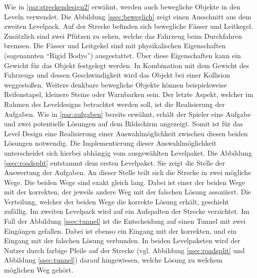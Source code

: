		Wie in \ref{par:streckendesign2} erwähnt, werden auch bewegliche Objekte in den Leveln verwendet. Die Abbildung \ref{ssec:beweglich} zeigt einen Ausschnitt aus dem zweiten Levelpack. Auf der Strecke befinden sich bewegliche Fässer und Leitkegel. Zusätzlich sind zwei Pfützen zu sehen, welche das Fahrzeug beim Durchfahren bremsen. Die Fässer und Leitgekel sind mit physikalischen Eigenschaften (sogenannten \enquote{Rigid Bodys}) ausgestattet. Über diese Eigenschaften kann ein Gewicht für das Objekt festgelegt werden. In Kombination mit dem Gewicht des Fahrzeugs und dessen Geschwindigkeit wird das Objekt bei einer Kollision weggestoßen. Weitere denkbare bewegliche Objekte können beispielsweise Reifenstapel, kleinere Steine oder Warnbarken sein.
		Der letzte Aspekt, welcher im Rahmen des Leveldesigns betrachtet werden soll, ist die Realisierung der Aufgaben. Wie in \ref{par:aufgaben} bereits erwähnt, erhält der Spieler eine Aufgabe und zwei potentielle Lösungen auf dem Bildschirm angezeigt. Somit ist für das Level Design eine Realisierung einer Auswahlmöglichkeit zwischen diesen beiden Lösungen notwendig. Die Implementierung dieser Auswahlmöglichkeit unterscheidet sich hierbei abhängig vom ausgewählten Levelpaket.
		Die Abbildung \ref{ssec:roadsplit} entstammt dem ersten Levelpaket. Sie zeigt die Stelle der Auswertung der Aufgaben. An dieser Stelle teilt sich die Strecke in zwei mögliche Wege. Die beiden Wege sind exakt gleich lang. Dabei ist einer der beiden Wege mit der korrekten, der jeweils andere Weg mit der falschen Lösung assoziiert. Die Verteilung, welcher der beiden Wege die korrekte Lösung erhält, geschieht zufällig.
		Im zweiten Levelpack wird auf ein Aufspalten der Strecke verzichtet. Im Fall der Abbildung \ref{ssec:tunnel} ist die Entscheidung auf einen Tunnel mit zwei Eingängen gefallen. Dabei ist ebenso ein Eingang mit der korrekten, und ein Eingang mit der falschen Lösung verbunden. In beiden Levelpaketen wird der Nutzer durch farbige Pfeile auf der Strecke (vgl. Abbildung \ref{ssec:roadsplit} und Abbildung \ref{ssec:tunnel}) darauf hingewiesen, welche Lösung zu welchem möglichen Weg gehört.

